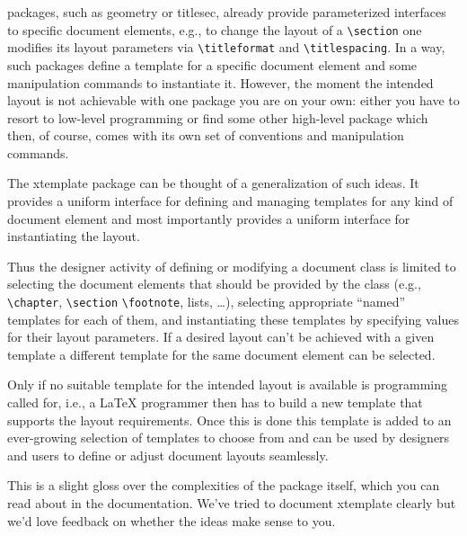 \documentclass{ltnews}
\begin{document}
\LaTeXe{} packages, such as \textsf{geometry} or \textsf{titlesec}, already provide
parameterized interfaces to specific document elements, e.g., to change the
layout of a \verb|\section| one modifies its layout parameters via \verb|\titleformat| and \verb|\titlespacing|.
In a way, such packages define a template for a specific document element and
some manipulation commands to instantiate it. 
\pagebreak
However, the moment the intended
layout is not achievable with one package you are on your own: either you have
to resort to low-level programming or find some other high-level package which
then, of course, comes with its own set of conventions and manipulation commands.

The \textsf{xtemplate} package can be thought of a generalization of such
ideas. It provides a uniform interface for defining and managing templates for
any kind of document element and most importantly provides a uniform interface
for instantiating the layout.

Thus the designer activity of defining or modifying a document class is
limited to selecting the document elements that should be provided by the
class (e.g., \verb|\chapter|, \verb|\section| \verb|\footnote|, lists, \ldots), selecting
appropriate ``named'' templates for each of them, and instantiating these
templates by specifying values for their layout parameters. If a desired
layout can't be achieved with a given template a different template for the
same document element can be selected. 

Only if no suitable template for the intended layout is available is programming
called for, i.e., a \LaTeX{} programmer then has to build a new template
that supports the layout requirements. Once this is done this template is
added to an ever-growing selection of templates to choose from and can be
used by designers and users to define or adjust document layouts seamlessly.

This is a slight gloss over the complexities of the package itself, which you can read about in the documentation. We've tried to document \textsf{xtemplate} clearly but we'd love feedback on whether the ideas make sense to you.
\end{document}
